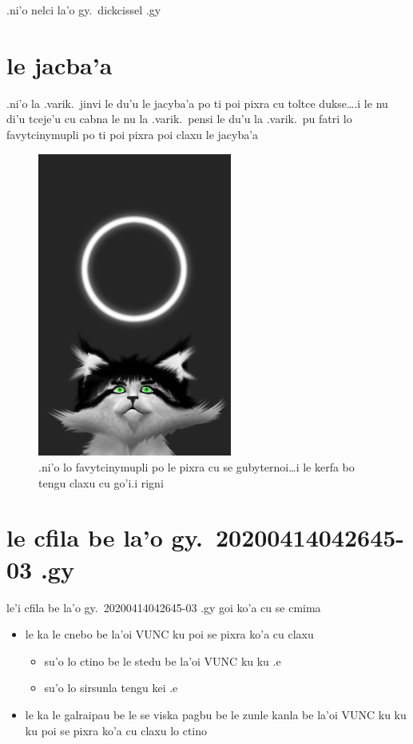 \documentclass{report}
\begin{document}
.ni'o nelci la'o gy.\ dickcissel .gy

\section{le jacba'a}
.ni'o la .varik.\ jinvi le du'u le jacyba'a po ti poi pixra cu toltce dukse\ldots\@ .i le nu di'u tceje'u cu cabna le nu la .varik.\ pensi le du'u la .varik.\ pu fatri lo favytcinymupli po ti poi pixra poi claxu le jacyba'a

\begin{figure}[ht]
	\centering
	\includegraphics[height=10cm]{20200414042645-03/20200414042645-03-uw.png}
	\caption[center]{.ni'o lo favytcinymupli po le pixra cu se gubyternoi\ldots i le kerfa bo tengu claxu cu go'i\@  .i rigni}
\end{figure}

\section{le cfila be la'o gy.\ 20200414042645-03 .gy}
le'i cfila be la'o gy.\ 20200414042645-03 .gy goi ko'a cu se cmima
\begin{itemize}
	\item le ka le cnebo be la'oi VUNC ku poi se pixra ko'a cu claxu
	\begin{itemize}
		\item su'o lo ctino be le stedu be la'oi VUNC ku ku .e
		\item su'o lo sirsunla tengu kei .e
	\end{itemize}
	\item le ka le galraipau be le se viska pagbu be le zunle kanla be la'oi VUNC ku ku ku poi se pixra ko'a cu claxu lo ctino
\end{itemize}
\end{document}
